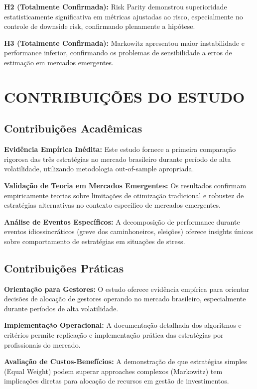 \textbf{H2 (Totalmente Confirmada):} Risk Parity demonstrou superioridade estatisticamente significativa em métricas ajustadas ao risco, especialmente no controle de downside risk, confirmando plenamente a hipótese.

\textbf{H3 (Totalmente Confirmada):} Markowitz apresentou maior instabilidade e performance inferior, confirmando os problemas de sensibilidade a erros de estimação em mercados emergentes.

\section{CONTRIBUIÇÕES DO ESTUDO}

\subsection{Contribuições Acadêmicas}

\textbf{Evidência Empírica Inédita:} Este estudo fornece a primeira comparação rigorosa das três estratégias no mercado brasileiro durante período de alta volatilidade, utilizando metodologia out-of-sample apropriada.

\textbf{Validação de Teoria em Mercados Emergentes:} Os resultados confirmam empiricamente teorias sobre limitações de otimização tradicional e robustez de estratégias alternativas no contexto específico de mercados emergentes.

\textbf{Análise de Eventos Específicos:} A decomposição de performance durante eventos idiossincráticos (greve dos caminhoneiros, eleições) oferece insights únicos sobre comportamento de estratégias em situações de stress.

\subsection{Contribuições Práticas}

\textbf{Orientação para Gestores:} O estudo oferece evidência empírica para orientar decisões de alocação de gestores operando no mercado brasileiro, especialmente durante períodos de alta volatilidade.

\textbf{Implementação Operacional:} A documentação detalhada dos algoritmos e critérios permite replicação e implementação prática das estratégias por profissionais do mercado.

\textbf{Avaliação de Custos-Benefícios:} A demonstração de que estratégias simples (Equal Weight) podem superar approaches complexos (Markowitz) tem implicações diretas para alocação de recursos em gestão de investimentos.

